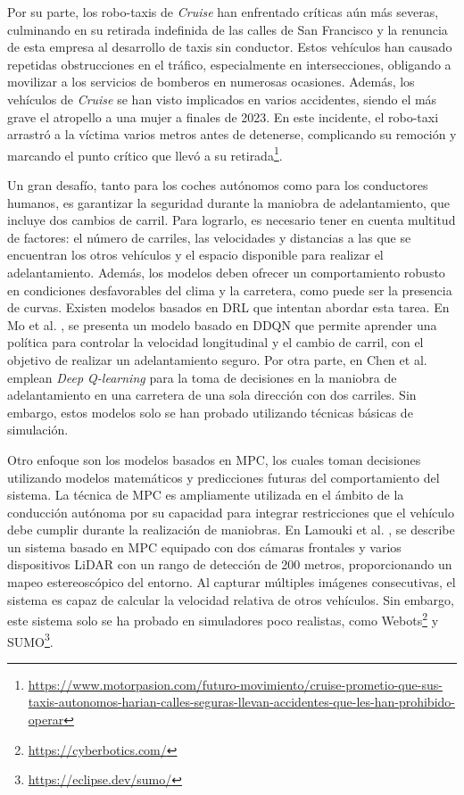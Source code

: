 Por su parte, los robo-taxis de \textit{Cruise} han enfrentado críticas aún más severas, culminando en su retirada indefinida de las calles de San Francisco y la renuncia de esta empresa al desarrollo de taxis sin conductor. Estos vehículos han causado repetidas obstrucciones en el tráfico, especialmente en intersecciones, obligando a movilizar a los servicios de bomberos en numerosas ocasiones. Además, los vehículos de \textit{Cruise} se han visto implicados en varios accidentes, siendo el más grave el atropello a una mujer a finales de 2023. En este incidente, el robo-taxi arrastró a la víctima varios metros antes de detenerse, complicando su remoción y marcando el punto crítico que llevó a su retirada\footnote{\url{https://www.motorpasion.com/futuro-movimiento/cruise-prometio-que-sus-taxis-autonomos-harian-calles-seguras-llevan-accidentes-que-les-han-prohibido-operar}}.

Un gran desafío, tanto para los coches autónomos como para los conductores humanos, es garantizar la seguridad durante la maniobra de adelantamiento, que incluye dos cambios de carril. Para lograrlo, es necesario tener en cuenta multitud de factores: el número de carriles, las velocidades y distancias a las que se encuentran los otros vehículos y el espacio disponible para realizar el adelantamiento. Además, los modelos deben ofrecer un comportamiento robusto en condiciones desfavorables del clima y la carretera, como puede ser la presencia de curvas. Existen modelos basados en \ac{DRL} que intentan abordar esta tarea. En Mo et al. \cite{overtaken-dqn}, se presenta un modelo basado en \ac{DDQN} que permite aprender una política para controlar la velocidad longitudinal y el cambio de carril, con el objetivo de realizar un adelantamiento seguro. Por otra parte, en Chen et al. \cite{overtaken-q} emplean \textit{Deep Q-learning} para la toma de decisiones en la maniobra de adelantamiento en una carretera de una sola dirección con dos carriles. Sin embargo, estos modelos solo se han probado utilizando técnicas básicas de simulación.

Otro enfoque son los modelos basados en \ac{MPC}, los cuales toman decisiones utilizando modelos matemáticos y predicciones futuras del comportamiento del sistema. La técnica de \ac{MPC} es ampliamente utilizada en el ámbito de la conducción autónoma por su capacidad para integrar restricciones que el vehículo debe cumplir durante la realización de maniobras. En Lamouki et al. \cite{mcp}, se describe un sistema basado en \ac{MPC} equipado con dos cámaras frontales y varios dispositivos \ac{LiDAR} con un rango de detección de 200 metros, proporcionando un mapeo estereoscópico del entorno. Al capturar múltiples imágenes consecutivas, el sistema es capaz de calcular la velocidad relativa de otros vehículos. Sin embargo, este sistema solo se ha probado en simuladores poco realistas, como Webots\footnote{\url{https://cyberbotics.com/}} y SUMO\footnote{\url{https://eclipse.dev/sumo/}}.

